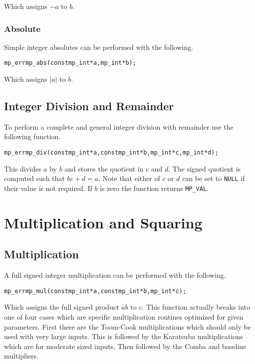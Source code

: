 \documentclass[synpaper]{book}
\begin{document}
Which assigns $-a$ to $b$.

\subsection{Absolute}
Simple integer absolutes can be performed with the following.

\begin{alltt}
mp_err mp_abs (const mp_int *a, mp_int *b);
\end{alltt}

Which assigns $\vert a \vert$ to $b$.

\section{Integer Division and Remainder}
To perform a complete and general integer division with remainder use the following function.

\begin{alltt}
mp_err mp_div (const mp_int *a, const mp_int *b, mp_int *c, mp_int *d);
\end{alltt}

This divides $a$ by $b$ and stores the quotient in $c$ and $d$.  The signed quotient is computed such that
$bc + d = a$.  Note that either of $c$ or $d$ can be set to \texttt{NULL} if their value is not required.  If
$b$ is zero the function returns \texttt{MP\_VAL}.


\chapter{Multiplication and Squaring}
\section{Multiplication}
A full signed integer multiplication can be performed with the following.
\begin{alltt}
mp_err mp_mul (const mp_int *a, const mp_int *b, mp_int *c);
\end{alltt}
Which assigns the full signed product $ab$ to $c$.  This function actually breaks into one of four cases which are
specific multiplication routines optimized for given parameters.  First there are the Toom-Cook multiplications which
should only be used with very large inputs.  This is followed by the Karatsuba multiplications which are for moderate
sized inputs.  Then followed by the Comba and baseline multipliers.
\end{document}
